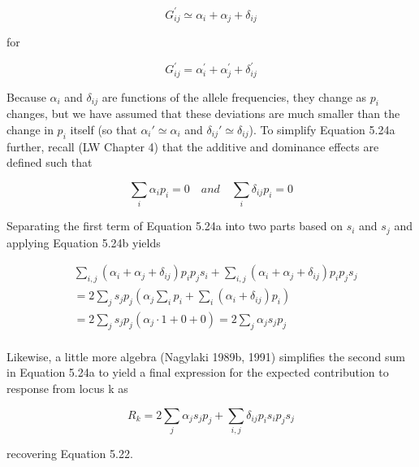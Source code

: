 \documentclass{article}
\begin{document}
\begin{equation}
G_{i j}^{\prime}\simeq\alpha_{i}+\alpha_{j}+\delta_{i j}
\end{equation}

for

\begin{equation}
G_{i j}^{\prime}=\alpha_{i}^{\prime}+\alpha_{j}^{\prime}+\delta_{i j}^{\prime}
\end{equation}

Because  $ \alpha_i $ and  $ \delta_{ij} $ are functions of the allele frequencies, they change as  $ p_i $ changes, but we have assumed that these deviations are much smaller than the change in  $ p_i $ itself (so that  $ \alpha_i' \simeq \alpha_i $ and  $ \delta_{ij}' \simeq \delta_{ij} $). To simplify Equation 5.24a further, recall (LW Chapter 4) that the additive and dominance effects are defined such that

\begin{equation}
\sum_{i}\alpha_{i}p_{i}=0\quad and\quad\sum_{i}\delta_{ij}p_{i}=0
\tag{5.24b}
\label{eq:5_24b}
\end{equation}

Separating the first term of Equation 5.24a into two parts based on  $ s_{i} $ and  $ s_{j} $ and applying Equation 5.24b yields

\begin{equation}
\begin{aligned}&\sum_{i,j}\left(\alpha_{i}+\alpha_{j}+\delta_{ij}\right)p_{i}p_{j}s_{i}+\sum_{i,j}\left(\alpha_{i}+\alpha_{j}+\delta_{ij}\right)p_{i}p_{j}s_{j}\\&=2\sum_{j}s_{j}p_{j}\left(\alpha_{j}\sum_{i}p_{i}+\sum_{i}\left(\alpha_{i}+\delta_{ij}\right)p_{i}\right)\\&=2\sum_{j}s_{j}p_{j}\left(\alpha_{j}\cdot1+0+0\right)=2\sum_{j}\alpha_{j}s_{j}p_{j}\\ \end{aligned}
\end{equation}

Likewise, a little more algebra (Nagylaki 1989b, 1991) simplifies the second sum in Equation 5.24a to yield a final expression for the expected contribution to response from locus k as

\begin{equation}
R_{k}=2\sum_{j}\alpha_{j}s_{j}p_{j}+\sum_{i,j}\delta_{ij}p_{i}s_{i}p_{j}s_{j}
\tag{5.24c}
\label{eq:5_24c}
\end{equation}

recovering Equation 5.22.
\end{document}
